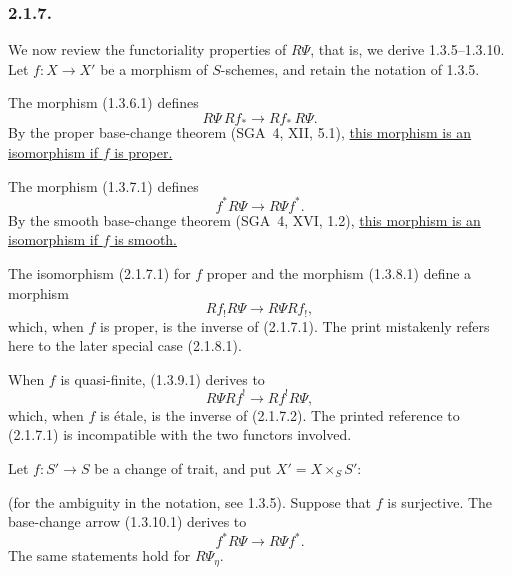\subsubsection*{2.1.7.}
We now review the functoriality properties of $R\Psi$, that is, we
derive 1.3.5--1.3.10.  Let $f:X\longrightarrow X'$ be a morphism of
$S$-schemes, and retain the notation of 1.3.5.

The morphism (1.3.6.1) defines
\begin{equation}\tag{2.1.7.1}
R\Psi\,Rf_*\longrightarrow Rf_*\,R\Psi.
\end{equation}
By the proper base-change theorem (SGA~4, XII, 5.1),
\underline{this morphism is an isomorphism if $f$ is proper.}

The morphism (1.3.7.1) defines
\begin{equation}\tag{2.1.7.2}
f^*R\Psi\longrightarrow R\Psi f^*.
\end{equation}
By the smooth base-change theorem (SGA~4, XVI, 1.2),
\underline{this morphism is an isomorphism if $f$ is smooth.}

The isomorphism (2.1.7.1) for $f$ proper and the morphism (1.3.8.1)
define a morphism
\begin{equation}\tag{2.1.7.3}
Rf_!R\Psi\longrightarrow R\Psi Rf_!,
\end{equation}
which, when $f$ is proper, is the inverse of (2.1.7.1).  The print
mistakenly refers here to the later special case (2.1.8.1).

When $f$ is quasi-finite, (1.3.9.1) derives to
\begin{equation}\tag{2.1.7.4}
R\Psi Rf^!\longrightarrow Rf^!R\Psi,
\end{equation}
which, when $f$ is \'{e}tale, is the inverse of (2.1.7.2).  The printed
reference to (2.1.7.1) is incompatible with the two functors involved.

Let $f:S'\longrightarrow S$ be a change of trait, and put
$X'=X\times_SS'$:
\begin{center}
\end{center}
(for the ambiguity in the notation, see 1.3.5).  Suppose that $f$ is
surjective.  The base-change arrow (1.3.10.1) derives to
\begin{equation}\tag{2.1.7.5}
f^*R\Psi\longrightarrow R\Psi f^*.
\end{equation}
The same statements hold for $R\Psi_\eta$.


